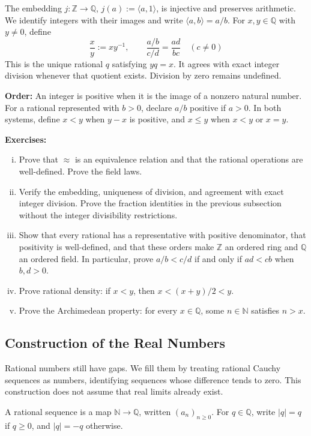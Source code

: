 \documentclass[a4paper,11pt,abstracton]{scrartcl}
\newcommand{\ZZ}{\mathbb{Z}}
\newcommand{\NN}{\mathbb{N}}
\newcommand{\QQ}{\mathbb{Q}}
\theoremstyle{dotlessP}
\theoremstyle{dotlessS}
\theoremstyle{remark}
\theoremstyle{definition}
\begin{document}
The embedding $j:\ZZ\to\QQ$, $j(a):=\langle a,1\rangle$, is injective
and preserves arithmetic. We identify integers with their images and
write $\langle a,b\rangle=a/b$. For $x,y\in\QQ$ with $y\ne0$, define
\[
    \frac{x}{y}:=xy^{-1},\qquad
    \frac{a/b}{c/d}=\frac{ad}{bc}\quad(c\ne0)
\]
This is the unique rational $q$ satisfying $yq=x$. It agrees with exact
integer division whenever that quotient exists. Division by zero remains
undefined.

\textbf{Order:} An integer is positive when it is the image of a nonzero
natural number. For a rational represented with $b>0$, declare $a/b$
positive if $a>0$. In both systems, define $x<y$ when $y-x$ is positive,
and $x\le y$ when $x<y$ or $x=y$.

\textbf{Exercises:}
\begin{enumerate}[(i)]
    \item Prove that $\approx$ is an equivalence relation and that the
    rational operations are well-defined. Prove the field laws.
    \item Verify the embedding, uniqueness of division, and agreement
    with exact integer division. Prove the fraction identities in the
    previous subsection without the integer divisibility restrictions.
    \item Show that every rational has a representative with positive
    denominator, that positivity is well-defined, and that these orders
    make $\ZZ$ an ordered ring and $\QQ$ an ordered field. In particular,
    prove $a/b<c/d$ if and only if $ad<cb$ when $b,d>0$.
    \item Prove rational density: if $x<y$, then $x<(x+y)/2<y$.
    \item Prove the Archimedean property: for every $x\in\QQ$, some $n\in\NN$
    satisfies $n>x$.
\end{enumerate}

\subsection{Construction of the Real Numbers}
\label{subsec:reals}

Rational numbers still have gaps. We fill them by treating rational
Cauchy sequences as numbers, identifying sequences whose difference
tends to zero. This construction does not assume that real limits
already exist.

A rational sequence is a map $\NN\to\QQ$, written $(a_n)_{n\ge0}$.
For $q\in\QQ$, write $|q|=q$ if $q\ge0$, and $|q|=-q$ otherwise.
\end{document}
